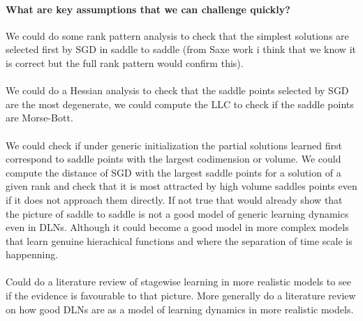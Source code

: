 \documentclass{article}
\theoremstyle{definition}
\begin{document}
\paragraph{What are key assumptions that we can challenge quickly?}
We could do some rank pattern analysis to check that the simplest solutions are selected first by SGD in saddle to saddle (from Saxe work i think that we know it is correct but the full rank pattern would confirm this). 
\\
\\
We could do a Hessian analysis to check that the saddle points selected by SGD are the most degenerate, we could compute the LLC to check if the saddle points are Morse-Bott. 
\\
\\
We could check if under generic initialization the partial solutions learned first correspond to saddle points with the largest codimension or volume. We could compute the distance of SGD with the largest saddle points for a solution of a given rank and check that it is most attracted by high volume saddles points even if it does not approach them directly. If not true that would already show that the picture of saddle to saddle is not a good model of generic learning dynamics even in DLNs. Although it could become a good model in more complex models that learn genuine hierachical functions and where the separation of time scale is happenning. 
\\
\\
Could do a literature review of stagewise learning in more realistic models to see if the evidence is favourable to that picture. More generally do a literature review on how good DLNs are as a model of learning dynamics in more realistic models.  
\end{document}
